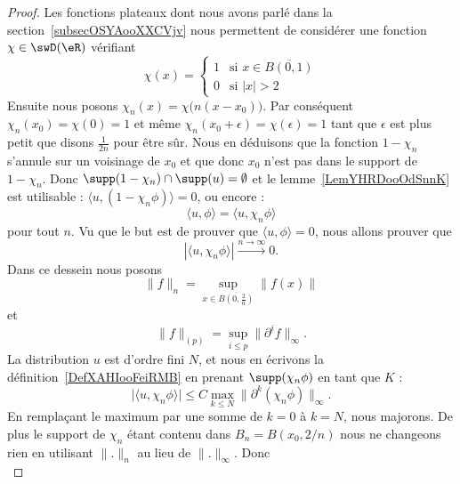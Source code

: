 \begin{proof}
	Les fonctions plateaux dont nous avons parlé dans la section~\ref{subsecOSYAooXXCVjv} nous permettent de considérer une fonction \( \chi\in\swD(\eR)\) vérifiant
	\begin{equation}
		\chi(x)=\begin{cases}
			1 & \text{si } x\in\overline{ B(0,1) } \\
			0 & \text{si } | x |>2
		\end{cases}
	\end{equation}
	Ensuite nous posons \( \chi_n(x)=\chi\big( n(x-x_0) \big)\). Par conséquent \( \chi_n(x_0)=\chi(0)=1\) et même \( \chi_n(x_0+\epsilon)=\chi(\epsilon)=1\) tant que \( \epsilon\) est plus petit que disons \( \frac{ 1 }{2n}\) pour être sûr. Nous en déduisons que la fonction \( 1-\chi_n\) s'annule sur un voisinage de \( x_0\) et que donc \( x_0\) n'est pas dans le support de \( 1-\chi_n\). Donc \( \supp(1-\chi_n)\cap\supp(u)=\emptyset\) et le lemme~\ref{LemYHRDooOdSnnK} est utilisable :
	\( \langle u, (1-\chi_n\phi)\rangle =0\), ou encore :
	\begin{equation}
		\langle u, \phi\rangle =\langle u, \chi_n\phi\rangle
	\end{equation}
	pour tout \( n\). Vu que le but est de prouver que \( \langle u, \phi\rangle =0\), nous allons prouver que
	\begin{equation}
		| \langle u, \chi_n\phi\rangle  |\stackrel{n\to\infty}{\longrightarrow}0.
	\end{equation}
	Dans ce dessein nous posons
	\begin{equation}
		\| f \|_n=\sup_{x\in\overline{ B(0,\frac{ 2 }{ n })}}\| f(x) \|
	\end{equation}
	et
	\begin{equation}
		\| f \|_{(p)}=\sup_{i\leq p}\| \partial^if \|_{\infty}.
	\end{equation}
	La distribution \( u\) est d'ordre fini \( N\), et nous en écrivons la définition~\ref{DefXAHIooFeiRMB} en prenant \( \supp(\chi_n\phi)\) en tant que \( K\) :
	\begin{equation}
		\big| \langle u, \chi_n\phi\rangle  \big|\leq C\max_{k\leq N}\| \partial^k(\chi_n\phi) \|_{\infty}.
	\end{equation}
	En remplaçant le maximum par une somme de \( k=0\) à \( k=N\), nous majorons. De plus le support de \( \chi_n\) étant contenu dans \( B_n=B(x_0,2/n)\) nous ne changeons rien en utilisant \( \| . \|_n\) au lieu de \( \| . \|_{\infty}\). Donc
	\begin{equation}

\end{equation}
\end{proof}

